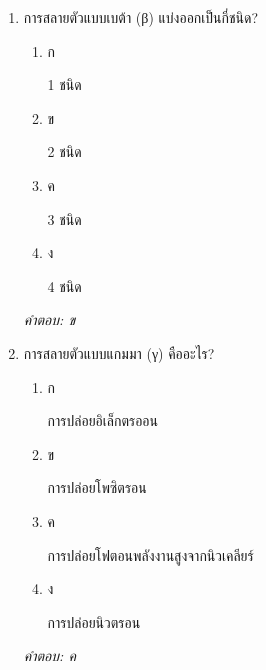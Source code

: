 \documentclass[12pt]{article}
\begin{document}
\begin{enumerate}[label=\arabic*., itemsep=0.5\baselineskip, topsep=0.5\baselineskip, leftmargin=*]
\item การสลายตัวแบบเบต้า (β) แบ่งออกเป็นกี่ชนิด?
\begin{enumerate}[label=\alph*)., itemsep=0.3\baselineskip, topsep=0.3\baselineskip]
\item ก\ 
\begin{minipage}[t]{0.9\linewidth}
\raggedright 1 ชนิด
\end{minipage}
\item ข\ 
\begin{minipage}[t]{0.9\linewidth}
\raggedright 2 ชนิด
\end{minipage}
\item ค\ 
\begin{minipage}[t]{0.9\linewidth}
\raggedright 3 ชนิด
\end{minipage}
\item ง\ 
\begin{minipage}[t]{0.9\linewidth}
\raggedright 4 ชนิด
\end{minipage}
\end{enumerate}
\vspace{-0.3\baselineskip}
\begin{small}
\textit{คำตอบ: ข}
\end{small}

\item การสลายตัวแบบแกมมา (γ) คืออะไร?
\begin{enumerate}[label=\alph*)., itemsep=0.3\baselineskip, topsep=0.3\baselineskip]
\item ก\ 
\begin{minipage}[t]{0.9\linewidth}
\raggedright การปล่อยอิเล็กตรออน
\end{minipage}
\item ข\ 
\begin{minipage}[t]{0.9\linewidth}
\raggedright การปล่อยโพซิตรอน
\end{minipage}
\item ค\ 
\begin{minipage}[t]{0.9\linewidth}
\raggedright การปล่อยโฟตอนพลังงานสูงจากนิวเคลียร์
\end{minipage}
\item ง\ 
\begin{minipage}[t]{0.9\linewidth}
\raggedright การปล่อยนิวตรอน
\end{minipage}
\end{enumerate}
\vspace{-0.3\baselineskip}
\begin{small}
\textit{คำตอบ: ค}
\end{small}


\end{enumerate}
\end{document}
